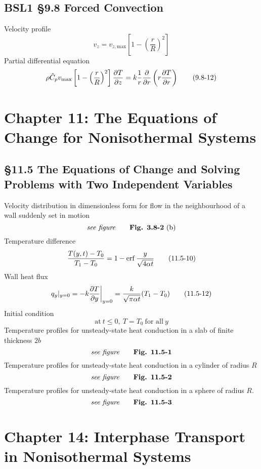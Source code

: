 \subsection{BSL1 \S9.8 Forced Convection}
Velocity profile
\[
	v_z=v_{z,\text{max}}\left[1-\left(\frac{r}{R}\right)^2\right]\tag{9.8-1}
\]
Partial differential equation
\[
	\rho\hat{C}_pv_\text{max}\left[1-\left(\frac{r}{R}\right)^2\right]\frac{\mathop{}\!\mathrm{\partial} T}{\mathop{}\!\mathrm{\partial} z} = k\frac{1}{r}\frac{\mathop{}\!\mathrm{\partial}}{\mathop{}\!\mathrm{\partial} r}\left(r\frac{\mathop{}\!\mathrm{\partial} T}{\mathop{}\!\mathrm{\partial} r}\right)\tag{9.8-12}
\]
\section{Chapter 11: The Equations of Change for Nonisothermal Systems}
\subsection{\S11.5 The Equations of Change and Solving Problems with Two Independent Variables}
Velocity distribution in dimensionless form for flow in the neighbourhood of a wall suddenly set in motion
\[
	\textit{see figure}\tag*{\textbf{Fig. 3.8-2} (b)}
\]
Temperature difference
\[
	\frac{T(y,t)-T_0}{T_1-T_0}=1-\erf\frac{y}{\sqrt{4\alpha t}}\tag{11.5-10}
\]
Wall heat flux
\[
	q_y|_{y=0}=-k\frac{\mathop{}\!\mathrm{\partial} T}{\mathop{}\!\mathrm{\partial} y}\bigg|_{y=0}=\frac{k}{\sqrt{\pi\alpha t}}(T_1-T_0)\tag{11.5-12}
\]
Initial condition
\[
	\text{at} \ t\leq0, \ T=T_0 \ \text{for all} \ y\tag{11.5-2}
\]
Temperature profiles for unsteady-state heat conduction in a slab of finite thickness $2b$
\[
	\textit{see figure}\tag*{\textbf{Fig. 11.5-1}}
\]
Temperature profiles for unsteady-state heat conduction in a cylinder of radius $R$
\[
	\textit{see figure}\tag*{\textbf{Fig. 11.5-2}}
\]
Temperature profiles for unsteady-state heat conduction in a sphere of radius $R$.
\[
	\textit{see figure}\tag*{\textbf{Fig. 11.5-3}}
\]
\section{Chapter 14: Interphase Transport in Nonisothermal Systems}
